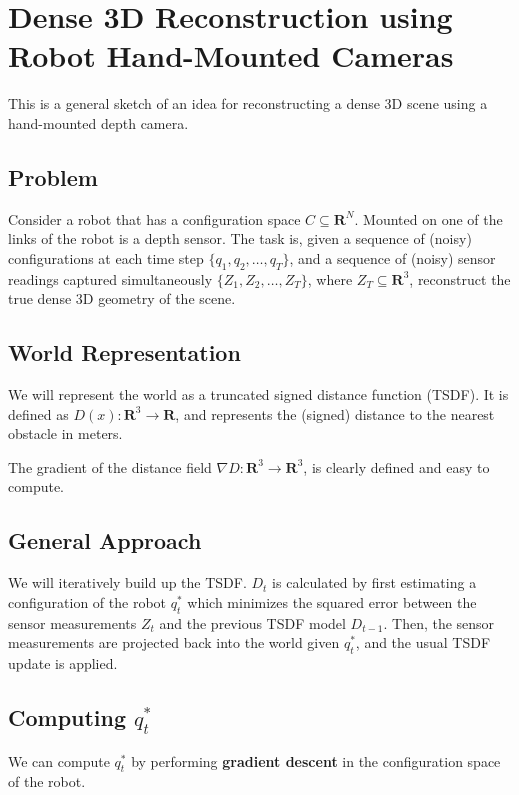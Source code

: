 \documentclass{article}
\begin{document}
\section{Dense 3D Reconstruction using Robot Hand-Mounted Cameras}

This is a general sketch of an idea for reconstructing a dense 3D scene using a
hand-mounted depth camera.

\subsection{Problem}

Consider a robot that has a configuration space $C \subseteq \mathbf{R}^N$.
Mounted on one of the links of the robot is a depth sensor. The task is, given a
sequence of (noisy) configurations at each time step $\{q_1, q_2, \ldots,
q_T\}$, and a sequence of (noisy) sensor readings captured simultaneously
$\{Z_1, Z_2, \ldots, Z_T\}$, where $Z_T \subseteq \mathbf{R}^3$, reconstruct the
true dense 3D geometry of the scene.

\subsection{World Representation}

We will represent the world as a truncated signed distance function (TSDF). It
is defined as $D(x) : \mathbf{R}^3 \to \mathbf{R}$, and represents the (signed)
distance to the nearest obstacle in meters.

The gradient of the distance field $\nabla D : \mathbf{R}^3 \to \mathbf{R}^3$,
is clearly defined and easy to compute.

\subsection{General Approach}

We will iteratively build up the TSDF. $D_t$ is calculated by first estimating a
configuration of the robot $q^*_t$ which minimizes the squared error between the
sensor measurements $Z_t$ and the previous TSDF model $D_{t - 1}$. Then, the
sensor measurements are projected back into the world given $q^*_t$, and the
usual TSDF update is applied.

\subsection{Computing $q^*_t$}

We can compute $q^*_t$ by performing \textbf{gradient descent} in the
configuration space of the robot. 
\end{document}
